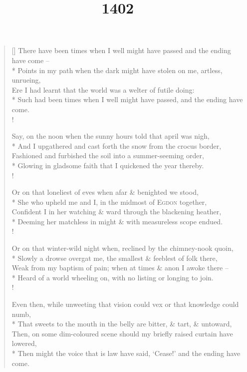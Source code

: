 \documentclass{amsart}
\title{1402}
\begin{document}
\maketitle

\settowidth{\versewidth}{There have been times when I well might have passed and the ending have come --}
\begin{verse}[\versewidth]
There have been times when I well might have passed and the ending have come --\\*
\vin Points in my path when the dark might have stolen on me, artless, unrueing,\\
\vin Ere I had learnt that the world was a welter of futile doing:\\*
Such had been times when I well might have passed, and the ending have come.\\!

Say, on the noon when the  sunny hours told that april was nigh,\\*
\vin And I upgathered and cast forth the snow from the crocus border,\\
\vin Fashioned and furbished the soil into a summer-seeming order,\\*
Glowing in gladsome faith that I quickened the year thereby.\\!

Or on that loneliest of eves when afar \& benighted we stood,\\*
\vin She who upheld me and I, in the midmost of \textsc{Egdon} together,\\
\vin Confident I in her watching \& ward through the blackening heather,\\*
Deeming her matchless in might \& with measureless scope endued.\\!

Or on that winter-wild night when, reclined by the chimney-nook quoin,\\*
\vin Slowly a drowse overgat me, the smallest \& feeblest of folk there,\\
\vin Weak from my baptism of pain; when at times \& anon I awoke there --\\*
Heard of a world wheeling on, with no listing or longing to join.\\!

Even then, while unweeting that vision could vex or that knowledge could numb,\\*
\vin That sweets to the mouth in the belly are bitter, \& tart, \& untoward,\\
\vin Then, on some dim-coloured scene should my briefly raised curtain have lowered,\\*
Then might the voice that is law have said, `Cease!' and the ending have come.
\end{verse}
\end{document}
